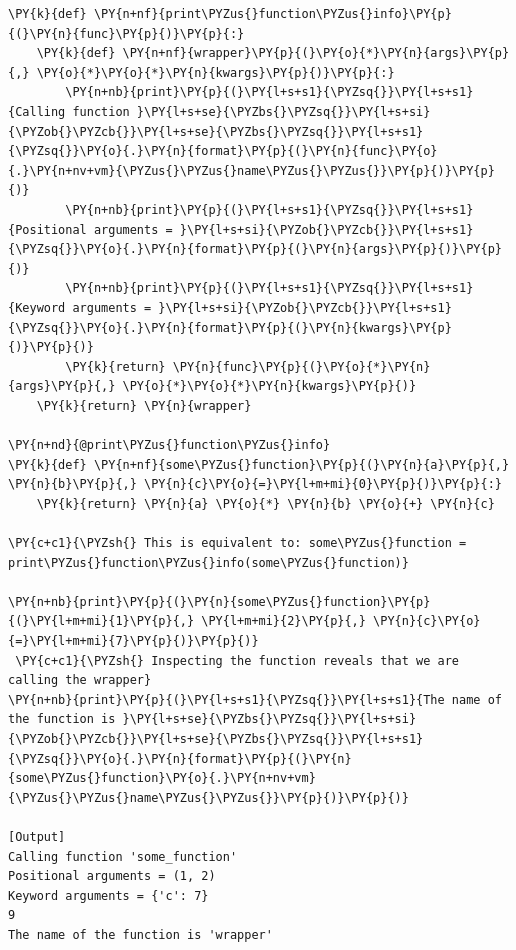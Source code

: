 \begin{Verbatim}[label=\makebox{\url{https://github.com/lucabaldini/cmepda/tree/master/slides/latex/snippets/decorator.py}},commandchars=\\\{\}]
\PY{k}{def} \PY{n+nf}{print\PYZus{}function\PYZus{}info}\PY{p}{(}\PY{n}{func}\PY{p}{)}\PY{p}{:}
    \PY{k}{def} \PY{n+nf}{wrapper}\PY{p}{(}\PY{o}{*}\PY{n}{args}\PY{p}{,} \PY{o}{*}\PY{o}{*}\PY{n}{kwargs}\PY{p}{)}\PY{p}{:}
        \PY{n+nb}{print}\PY{p}{(}\PY{l+s+s1}{\PYZsq{}}\PY{l+s+s1}{Calling function }\PY{l+s+se}{\PYZbs{}\PYZsq{}}\PY{l+s+si}{\PYZob{}\PYZcb{}}\PY{l+s+se}{\PYZbs{}\PYZsq{}}\PY{l+s+s1}{\PYZsq{}}\PY{o}{.}\PY{n}{format}\PY{p}{(}\PY{n}{func}\PY{o}{.}\PY{n+nv+vm}{\PYZus{}\PYZus{}name\PYZus{}\PYZus{}}\PY{p}{)}\PY{p}{)}
        \PY{n+nb}{print}\PY{p}{(}\PY{l+s+s1}{\PYZsq{}}\PY{l+s+s1}{Positional arguments = }\PY{l+s+si}{\PYZob{}\PYZcb{}}\PY{l+s+s1}{\PYZsq{}}\PY{o}{.}\PY{n}{format}\PY{p}{(}\PY{n}{args}\PY{p}{)}\PY{p}{)}
        \PY{n+nb}{print}\PY{p}{(}\PY{l+s+s1}{\PYZsq{}}\PY{l+s+s1}{Keyword arguments = }\PY{l+s+si}{\PYZob{}\PYZcb{}}\PY{l+s+s1}{\PYZsq{}}\PY{o}{.}\PY{n}{format}\PY{p}{(}\PY{n}{kwargs}\PY{p}{)}\PY{p}{)}
        \PY{k}{return} \PY{n}{func}\PY{p}{(}\PY{o}{*}\PY{n}{args}\PY{p}{,} \PY{o}{*}\PY{o}{*}\PY{n}{kwargs}\PY{p}{)}
    \PY{k}{return} \PY{n}{wrapper}

\PY{n+nd}{@print\PYZus{}function\PYZus{}info}
\PY{k}{def} \PY{n+nf}{some\PYZus{}function}\PY{p}{(}\PY{n}{a}\PY{p}{,} \PY{n}{b}\PY{p}{,} \PY{n}{c}\PY{o}{=}\PY{l+m+mi}{0}\PY{p}{)}\PY{p}{:}
    \PY{k}{return} \PY{n}{a} \PY{o}{*} \PY{n}{b} \PY{o}{+} \PY{n}{c}

\PY{c+c1}{\PYZsh{} This is equivalent to: some\PYZus{}function = print\PYZus{}function\PYZus{}info(some\PYZus{}function)}

\PY{n+nb}{print}\PY{p}{(}\PY{n}{some\PYZus{}function}\PY{p}{(}\PY{l+m+mi}{1}\PY{p}{,} \PY{l+m+mi}{2}\PY{p}{,} \PY{n}{c}\PY{o}{=}\PY{l+m+mi}{7}\PY{p}{)}\PY{p}{)}
 \PY{c+c1}{\PYZsh{} Inspecting the function reveals that we are calling the wrapper}
\PY{n+nb}{print}\PY{p}{(}\PY{l+s+s1}{\PYZsq{}}\PY{l+s+s1}{The name of the function is }\PY{l+s+se}{\PYZbs{}\PYZsq{}}\PY{l+s+si}{\PYZob{}\PYZcb{}}\PY{l+s+se}{\PYZbs{}\PYZsq{}}\PY{l+s+s1}{\PYZsq{}}\PY{o}{.}\PY{n}{format}\PY{p}{(}\PY{n}{some\PYZus{}function}\PY{o}{.}\PY{n+nv+vm}{\PYZus{}\PYZus{}name\PYZus{}\PYZus{}}\PY{p}{)}\PY{p}{)}

[Output]
Calling function 'some_function'
Positional arguments = (1, 2)
Keyword arguments = {'c': 7}
9
The name of the function is 'wrapper'
\end{Verbatim}